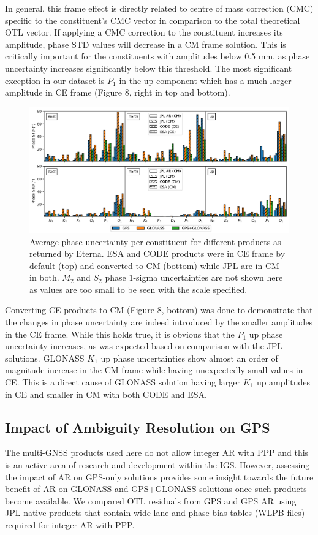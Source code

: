 \documentclass[se, manuscript]{copernicus}
\begin{document}
In general, this frame effect is directly related to centre of mass correction (CMC) specific to the constituent's CMC vector in comparison to the total theoretical OTL vector. If applying a CMC correction to the constituent increases its amplitude, phase STD values will decrease in a CM frame solution. This is critically important for the constituents with amplitudes below 0.5 mm, as phase uncertainty increases significantly below this threshold. The most significant exception in our dataset is $P_1$ in the up component which has a much larger amplitude in CE frame (Figure 8, right in top and bottom). 

\begin{figure}[t]
\includegraphics[width=17cm]{fig08.png}
\caption{Average phase uncertainty per constituent for different products as returned by Eterna. ESA and CODE products were in CE frame by default (top) and converted to CM (bottom) while JPL are in CM in both. $M_2$ and $S_2$ phase 1-sigma uncertainties are not shown here as values are too small to be seen with the scale specified.}
\end{figure}

Converting CE products to CM (Figure 8, bottom) was done to demonstrate that the changes in phase uncertainty are indeed introduced by the smaller amplitudes in the CE frame. While this holds true, it is obvious that the $P_1$ up phase uncertainty increases, as was expected based on comparison with the JPL solutions. GLONASS $K_1$ up phase uncertainties show almost an order of magnitude increase in the CM frame while having unexpectedly small values in CE. This is a direct cause of GLONASS solution having larger $K_1$ up amplitudes in CE and smaller in CM with both CODE and ESA.

\subsection{Impact of Ambiguity Resolution on GPS}
The multi-GNSS products used here do not allow integer AR with PPP and this is an active area of research and development within the IGS. However, assessing the impact of AR on GPS-only solutions provides some insight towards the future benefit of AR on GLONASS and GPS+GLONASS solutions once such products become available. We compared OTL residuals from GPS and GPS AR using JPL native products that contain wide lane and phase bias tables (WLPB files) required for integer AR with PPP.
\end{document}
